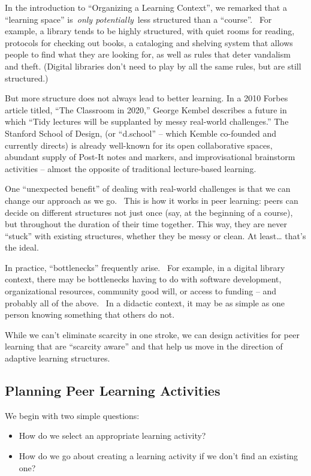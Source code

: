 In the introduction to ``Organizing a Learning Context'', we remarked
that a ``learning space'' is~\emph{only potentially}~less structured
than a ``course''. ~For example, a library tends to be highly
structured, with quiet rooms for reading, protocols for checking out
books, a cataloging and shelving system that allows people to find what
they are looking for, as well as rules that deter vandalism and theft.
(Digital libraries don't need to play by all the same rules, but are
still structured.)

But more structure does not always lead to better learning. In a 2010
Forbes article titled, ``The Classroom in 2020,'' George Kembel
describes a future in which ``Tidy lectures will be supplanted by messy
real-world challenges.'' The Stanford School of Design, (or ``d.school''
-- which Kemble co-founded and currently directs) is already well-known
for its open collaborative spaces, abundant supply of Post-It notes and
markers, and improvisational brainstorm activities -- almost the
opposite of traditional lecture-based learning.

One ``unexpected benefit'' of dealing with real-world challenges is that
we can change our approach as we go. ~This is how it works in peer
learning: peers can decide on different structures not just once (say,
at the beginning of a course), but throughout the duration of their time
together. This way, they are never ``stuck'' with existing structures,
whether they be messy or clean. At least\ldots{} that's the ideal.

In practice, ``bottlenecks'' frequently arise. ~For example, in a
digital library context, there may be bottlenecks having to do with
software development, organizational resources, community good will, or
access to funding -- and probably all of the above. ~In a didactic
context, it may be as simple as one person knowing something that others
do not.

While we can't eliminate scarcity in one stroke, we can design
activities for peer learning that are ``scarcity aware'' and that help
us move in the direction of adaptive learning structures.

\subsection{Planning Peer Learning Activities}

We begin with two simple questions:

\begin{itemize}
\itemsep1pt\parskip0pt
\item
  How do we select an appropriate learning activity?
\item
  How do we go about creating a learning activity if we don't find an
  existing one?
\end{itemize}

